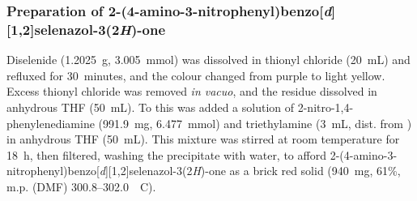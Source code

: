 \begin{refsection}

\subsubsection[Preparation of \refcmpd{ebs-3no2-4nh2}]{Preparation of 2-(4-amino-3-nitrophenyl)benzo[\emph{d}][1,2]selenazol-3(2\emph{H})-one }
Diselenide  (1.2025~g, 3.005~mmol) was dissolved in thionyl chloride (20~mL) and refluxed for 30~minutes, and the colour changed from purple to light yellow.
Excess thionyl chloride was removed \emph{in vacuo}, and the residue dissolved in anhydrous THF (50~mL).
To this was added a solution of 2-nitro-1,4-phenylenediamine (991.9~mg, 6.477~mmol) and triethylamine (3~mL, dist. from ) in anhydrous THF (50~mL).
This mixture was stirred at room temperature for 18~h, then filtered, washing the precipitate with water, to afford 2-(4-amino-3-nitrophenyl)benzo[\emph{d}][1,2]selenazol-3(2\emph{H})-one  as a brick red solid (940~mg, 61\%, m.p. (DMF) 300.8--302.0~\degree~C).



\end{refsection}

